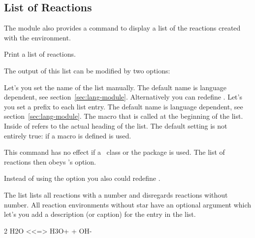 \documentclass{chemmacros-manual}
\begin{document}
\subsection{List of Reactions}

The  module also provides a command to display a list of
the reactions created with the  environment.
\begin{commands}
    Print a list of reactions.
\end{commands}
\begin{example}
  \listofreactions
\end{example}

The output of this list can be modified by two options:
\begin{options}
    Let's you set the name of the list manually.  The default name is language
    dependent, see section~\vref{sec:lang-module}.  Alternatively you can
    redefine .
    Let's you set a prefix to each list entry.  The default name is language
    dependent, see section~\vref{sec:lang-module}.
    The macro that is called at the beginning of the list.
    Inside of   refers to the actual heading of the list.
    The default setting is not entirely true: if a macro  is
    defined  is used. \par
    This command has no effect if a \KOMAScript\ class or the package
     is used. The list of reactions then obeys \KOMAScript's
     option.
\end{options}
Instead of using the option  you also could redefine
.

The list lists all reactions with a number and disregards reactions without
number.  All reaction environments without star have an optional argument
which let's you add a description (or caption) for the entry in the list.
\begin{example}
  \begin{reaction}[Autoprotolyse]
    2 H2O <<=> H3O+ + OH-
  \end{reaction}
\end{example}
\end{document}
